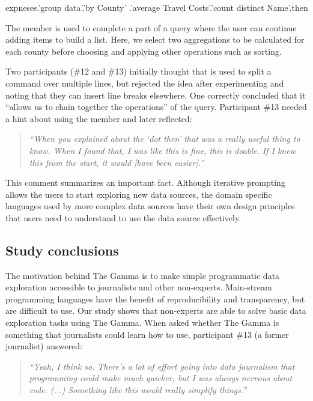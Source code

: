 \documentclass[manuscript,review,anonymous]{acmart}
\begin{document}
\begin{thegamma}
expneses.'group data'.'by County'
  .'average Travel Costs'.'count distinct Name'.then
\end{thegamma}

The  member is used to complete a part of a query where the user can continue
adding items to build a list. Here, we select two aggregations to be calculated for each
county before choosing  and applying other operations such as sorting.

Two participants (\#12 and \#13) initially thought that  is used to split a command
over multiple lines, but rejected the idea after experimenting and noting that they can insert
line breaks elsewhere. One correctly concluded that it ``allows us to chain together the
operations'' of the query. Participant \#13 needed a hint about using the
 member and later reflected:

\begin{quote}
  \emph{``When you explained about the `dot then' that was a really useful thing to know.
  When I found that, I was like this is fine, this is doable. If I knew this from the start,
  it would [have been easier].''}
\end{quote}

This comment summarizes an important fact. Although iterative prompting allows the users to start
exploring new data sources, the domain specific languages used by more complex data sources have
their own design principles that users need to understand to use the data source effectively.

\subsection{Study conclusions}
The motivation behind The Gamma is to make simple programmatic data exploration accessible to
journalists and other non-experts. Main-stream programming languages have the benefit of
reproducibility and transparency, but are difficult to use. Our study shows that non-experts
are able to solve basic data exploration tasks using The Gamma. When asked whether The Gamma
is something that journalists could learn how to use, participant \#13 (a former journalist) answered:

\begin{quote}
\emph{``Yeah, I think so. There's a lot of effort going into data journalism that
  programming could make much quicker, but I was always nervous about code. (...)
  Something like this would really simplify things.''}
\end{quote}
\end{document}
